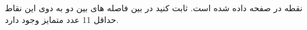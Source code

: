  نقطه در صفحه داده شده است. ثابت کنید در بین فاصله های بین دو به دوی این نقاط حداقل 11 عدد متمایز وجود دارد.